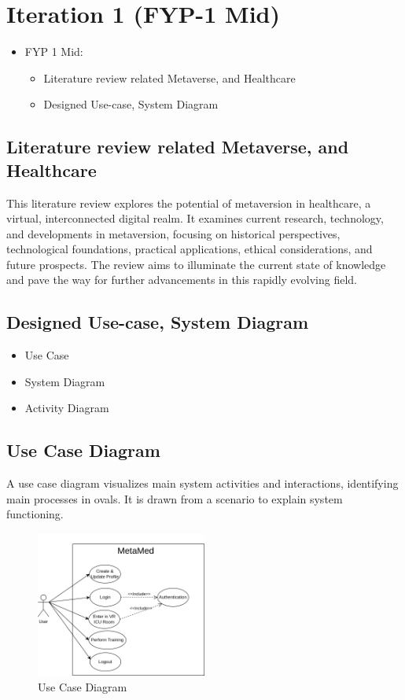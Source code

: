 \chapter{Iteration 1 (FYP-1 Mid)}
\label{ch:iter1}
\begin{itemize}
    \item FYP 1 Mid: 
    \begin{itemize}
    \item Literature review related Metaverse, and Healthcare
    \item Designed Use-case, System Diagram
    \end{itemize}
\end{itemize}


\section{Literature review related Metaverse, and Healthcare}
{This literature review explores the potential of metaversion in healthcare, a virtual, interconnected digital realm. It examines current research, technology, and developments in metaversion, focusing on historical perspectives, technological foundations, practical applications, ethical considerations, and future prospects. The review aims to illuminate the current state of knowledge and pave the way for further advancements in this rapidly evolving field.
}

\section{Designed Use-case, System Diagram}
\begin{itemize}
    \item Use Case 
    \item System Diagram
    \item Activity Diagram
\end{itemize}


\section{Use Case Diagram}
A use case diagram visualizes main system activities and interactions, identifying main processes in ovals. It is drawn from a scenario to explain system functioning.
\begin{figure}[h]
    \centering
    \includegraphics[width=0.5\textwidth, height=0.3\textheight]{Images/Use Case.drawio.png}
    \caption{Use Case Diagram}
    \label{fig:system-diagram}
\end{figure}

